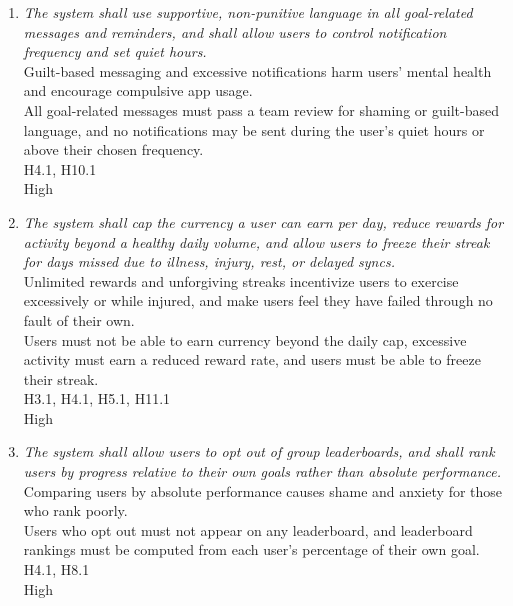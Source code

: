 \documentclass{article}
\begin{document}
\begin{enumerate}[{SR}1:]
\item \hypertarget{sr7}{}\emph{The system shall use supportive, non-punitive language in all goal-related messages and reminders, and shall allow users to control notification frequency and set quiet hours.}\\
     Guilt-based messaging and excessive notifications harm users' mental health and encourage compulsive app usage.\\
     All goal-related messages must pass a team review for shaming or guilt-based language, and no notifications may be sent during the user's quiet hours or above their chosen frequency.\\
     H4.1, H10.1\\
     High

\item \hypertarget{sr8}{}\emph{The system shall cap the currency a user can earn per day, reduce rewards for activity beyond a healthy daily volume, and allow users to freeze their streak for days missed due to illness, injury, rest, or delayed syncs.}\\
     Unlimited rewards and unforgiving streaks incentivize users to exercise excessively or while injured, and make users feel they have failed through no fault of their own.\\
     Users must not be able to earn currency beyond the daily cap, excessive activity must earn a reduced reward rate, and users must be able to freeze their streak.\\
     H3.1, H4.1, H5.1, H11.1\\
     High

\item \hypertarget{sr9}{}\emph{The system shall allow users to opt out of group leaderboards, and shall rank users by progress relative to their own goals rather than absolute performance.}\\
     Comparing users by absolute performance causes shame and anxiety for those who rank poorly.\\
     Users who opt out must not appear on any leaderboard, and leaderboard rankings must be computed from each user's percentage of their own goal.\\
     H4.1, H8.1\\
     High


\end{enumerate}
\end{document}
